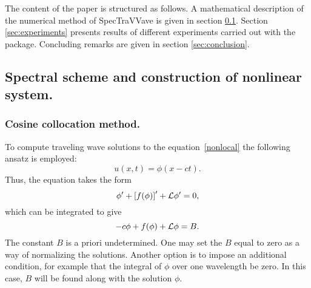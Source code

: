 The content of the paper is structured as follows. A mathematical description of the numerical method of 
\textsf{SpecTraVVave} is given in section \ref{sec:spectral}. Section \ref{sec:experiments} presents results of different experiments carried out with the package. Concluding remarks are given in section \ref{sec:conclusion}. 

\subsection{Spectral scheme and construction of nonlinear system.}
\label{sec:spectral}
\subsubsection{Cosine collocation method.}
To compute traveling wave solutions to the equation~\eqref{nonlocal} the following ansatz is employed:
\begin{equation*}%
u(x,t) = \phi(x-ct).
\end{equation*}
Thus, the equation takes the form
\begin{equation*}%
\phi' + \left[f(\phi) \right]' + \Lop \phi' = 0,
\end{equation*}
which can be integrated to give
\begin{equation}\label{int_gen1}
-c \phi + f(\phi)  + \mathcal{L} \phi = B. 
\end{equation}
The constant $B$ is a priori undetermined. One may set the $B$ equal to 
zero as a way of normalizing the solutions. Another option is to impose
an additional condition, for example that the integral of $\phi$ over
one wavelength be zero. In this case, $B$ will be found along with the solution $\phi$.

